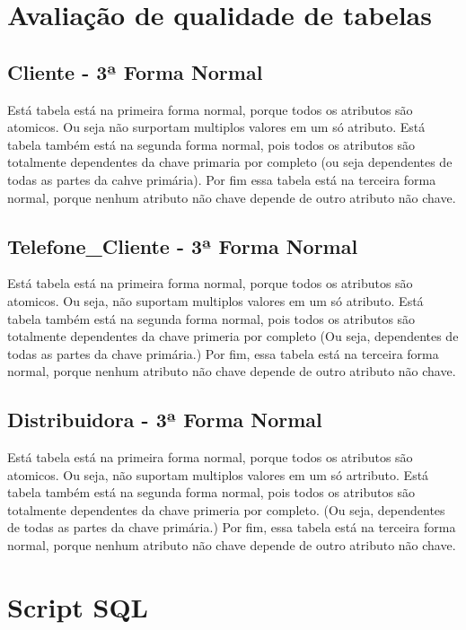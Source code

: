\documentclass[11pt]{article}
\begin{document}
\section{Avaliação de qualidade de tabelas}
\subsection{Cliente - 3ª Forma Normal}
Está tabela está na primeira forma normal, porque todos os atributos são atomicos. Ou seja não surportam multiplos valores em um só atributo. 
Está tabela também está na segunda forma normal, pois todos os atributos são totalmente dependentes da chave primaria por completo (ou seja dependentes de todas as partes da cahve primária).
Por fim essa tabela está na terceira forma normal, porque nenhum atributo não chave depende de outro atributo não chave.  
\\
\subsection{Telefone\_Cliente - 3ª Forma Normal}
Está tabela está na primeira forma normal, porque todos os atributos são atomicos. Ou seja, não suportam multiplos valores em um só atributo. 
Está tabela também está na segunda forma normal, pois todos os atributos são totalmente dependentes da chave primeria por completo (Ou seja, dependentes de todas as partes da chave primária.) 
Por fim, essa tabela está na terceira forma normal, porque nenhum atributo não chave depende de outro atributo não chave. 
\\
\subsection{Distribuidora - 3ª Forma Normal}
Está tabela está na primeira forma normal, porque todos os atributos são atomicos. Ou seja, não suportam multiplos valores em um só artributo. 
Está tabela também está na segunda forma normal, pois todos os atributos são totalmente dependentes da chave primeria por completo. (Ou seja, dependentes de todas as partes da chave primária.) 
Por fim, essa tabela está na terceira forma normal, porque nenhum atributo não chave depende de outro atributo não chave. 
\\

\section{Script SQL}
\end{document}
